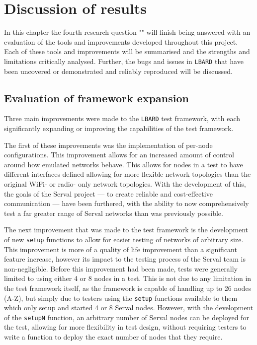 
\chapter{Discussion of results} %

\label{Chapter7} %

In this chapter the fourth research question "\fourthRQ" will finish being answered with an evaluation of the tools and improvements developed throughout this project.
Each of these tools and improvements will be summarised and the strengths and limitations critically analysed.
Further, the bugs and issues in \texttt{LBARD} that have been uncovered or demonstrated and reliably reproduced will be discussed.

\section{Evaluation of framework expansion}
Three main improvements were made to the \texttt{LBARD} test framework, with each significantly expanding or improving the capabilities of the test framework.

The first of these improvements was the implementation of per-node configurations.
This improvement allows for an increased amount of control around how emulated networks behave.
This allows for nodes in a test to have different interfaces defined allowing for more flexible network topologies than the original WiFi- or radio- only network topologies.
With the development of this, the goals of the Serval project — to create reliable and cost-effective communication — have been furthered, with the ability to now comprehensively test a far greater range of Serval networks than was previously possible.

The next improvement that was made to the test framework is the development of new \texttt{setup} functions to allow for easier testing of networks of arbitrary size.
This improvement is more of a quality of life improvement than a significant feature increase, however its impact to the testing process of the Serval team is non-negligible.
Before this improvement had been made, tests were generally limited to using either 4 or 8 nodes in a test. 
This is not due to any limitation in the test framework itself, as the framework is capable of handling up to 26 nodes (A-Z), but simply due to testers using the \texttt{setup} functions available to them which only setup and started 4 or 8 Serval nodes.
However, with the development of the \texttt{setupN} function, an arbitrary number of Serval nodes can be deployed for the test, allowing for more flexibility in test design, without requiring testers to write a function to deploy the exact number of nodes that they require.

